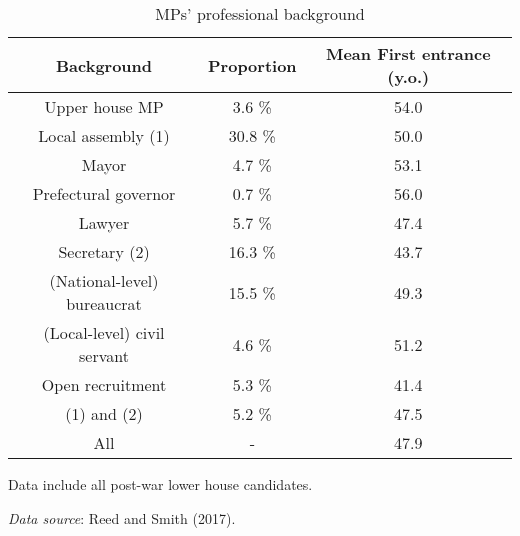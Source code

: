 \begin{table}
\begin{threeparttable}
\begin{tabular}{c|cc}
\toprule
Background & Proportion & Mean First entrance (y.o.)\\
\midrule
Upper house MP & 3.6 \% & 54.0 \\
Local assembly (1) & 30.8 \% & 50.0 \\
Mayor & 4.7 \% & 53.1 \\
Prefectural governor & 0.7 \% & 56.0 \\
Lawyer & 5.7 \% & 47.4 \\
Secretary (2) & 16.3 \% & 43.7 \\ 
(National-level) bureaucrat & 15.5 \% & 49.3 \\
(Local-level) civil servant & 4.6 \% & 51.2 \\
Open recruitment & 5.3 \% & 41.4 \\
(1) and (2) & 5.2 \% & 47.5 \\
All & - & 47.9 \\
\bottomrule
\end{tabular}
\begin{tablenotes}[flushleft]
  \scriptsize{
    \item Data include all post-war lower house candidates. 
    \item \textit{Data source}: Reed and Smith (2017). 
  }
\end{tablenotes}
\end{threeparttable}
\caption{MPs' professional background}
\label{table:propProfessionWinners}
\end{table}